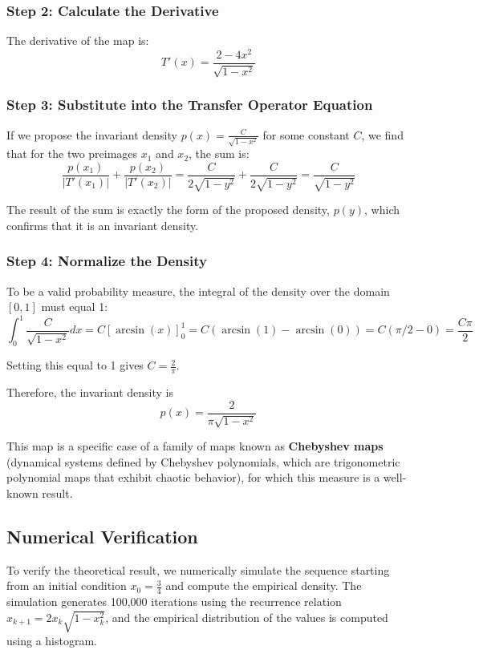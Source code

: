 \documentclass[12pt,a4paper]{article}
\begin{document}
\subsubsection{Step 2: Calculate the Derivative}

The derivative of the map is:
\[
T'(x) = \frac{2-4x^2}{\sqrt{1-x^2}}
\]

\subsubsection{Step 3: Substitute into the Transfer Operator Equation}

If we propose the invariant density $p(x) = \frac{C}{\sqrt{1-x^2}}$ for some constant $C$, we find that for the two preimages $x_1$ and $x_2$, the sum is:
\[
\frac{p(x_1)}{|T'(x_1)|} + \frac{p(x_2)}{|T'(x_2)|} = \frac{C}{2\sqrt{1-y^2}} + \frac{C}{2\sqrt{1-y^2}} = \frac{C}{\sqrt{1-y^2}}
\]

The result of the sum is exactly the form of the proposed density, $p(y)$, which confirms that it is an invariant density.

\subsubsection{Step 4: Normalize the Density}

To be a valid probability measure, the integral of the density over the domain $[0, 1]$ must equal 1:
\[
\int_0^1 \frac{C}{\sqrt{1-x^2}}dx = C[\arcsin(x)]_0^1 = C(\arcsin(1)-\arcsin(0)) = C(\pi/2 - 0) = \frac{C\pi}{2}
\]

Setting this equal to 1 gives $C = \frac{2}{\pi}$.

Therefore, the invariant density is 
\[
p(x) = \frac{2}{\pi\sqrt{1-x^2}}
\]

This map is a specific case of a family of maps known as \textbf{Chebyshev maps} (dynamical systems defined by Chebyshev polynomials, which are trigonometric polynomial maps that exhibit chaotic behavior), for which this measure is a well-known result.

\subsection{Numerical Verification}

To verify the theoretical result, we numerically simulate the sequence starting from an initial condition $x_0 = \frac{3}{4}$ and compute the empirical density. The simulation generates 100,000 iterations using the recurrence relation $x_{k+1} = 2x_k\sqrt{1-x_k^2}$, and the empirical distribution of the values is computed using a histogram.
\end{document}
